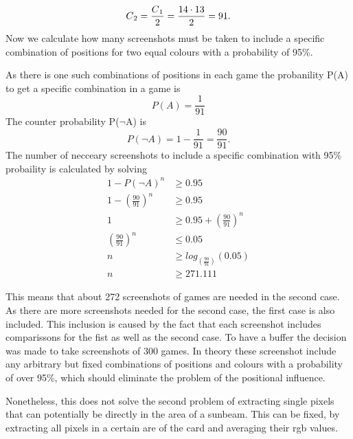 \begin{equation*}
C\textsubscript{2} = \frac{C\textsubscript{1}}{2} = \frac{14 \cdot 13}{2} = 91.
\end{equation*}
Now we calculate how many screenshots must be taken to include a specific combination of positions for two equal colours with a probability of 95\%. 
\begin{center}
	As there is one such combinations of positions in each game the probanility P(A) to get a specific combination in a game is 
	\begin{equation*}
	P(A) = \frac{1}{91} %
	\end{equation*}
	The counter probability P($\lnot$A) is 
	\begin{equation*}
	P(\lnot A) = 1 - \frac{1}{91} = \frac{90}{91}.%
	\end{equation*}
	The number of necceary screenshots to include a specific combination with 95\% probaility is calculated by solving
	\begin{align*}
	1 - P(\lnot A)^n &\geq 0.95 \\
	1 - \left(\frac{90}{91}\right)^n &\geq 0.95 \\
	1 &\geq 0.95 + \left(\frac{90}{91}\right)^n\\
	\left(\frac{90}{91}\right)^n &\leq 0.05\\
	n &\geq log_{(\frac{90}{91})}(0.05) \\
	n &\geq 271.111 %
	\end{align*}
\end{center}
This means that about 272 screenshots of games are needed in the second case. As there are more screenshots needed for the second case, the first case is also included. This inclusion is caused by the fact that each screenshot includes comparissons for the  fist  as well as the second case. To have a buffer the decision was made to take screenshots of 300 games. In theory these screenshot include any arbitrary but fixed combinations of positions and colours with a probability of over 95\%, which should eliminate the problem of the positional influence.

Nonetheless, this does not solve the second problem of extracting single pixels that can potentially be directly in the area of a sunbeam. This can be fixed, by extracting all pixels in a certain are of the card and averaging their rgb values.  %

